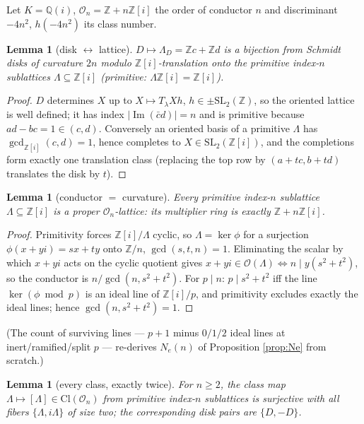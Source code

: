 \documentclass[11pt]{amsart}
\numberwithin{equation}{section}
\theoremstyle{plain}
\newtheorem{lemma}[theorem]{Lemma}
\theoremstyle{definition}
\theoremstyle{remark}
\newcommand{\Q}{\mathbb{Q}}
\newcommand{\Z}{\mathbb{Z}}
\newcommand{\Zi}{\Z[i]}
\newcommand{\SL}{\mathrm{SL}}
\newcommand{\Cl}{\mathrm{Cl}}
\newcommand{\im}{\operatorname{Im}}
\begin{document}
Let $K = \Q(i)$, $\mathcal{O}_n = \Z + n\Zi$ the order of conductor
$n$ and discriminant $-4n^2$, $h(-4n^2)$ its class number.

\begin{lemma}[disk $\leftrightarrow$ lattice]\label{lem:disklattice}
$D \mapsto \Lambda_D = \Z c + \Z d$ is a bijection from Schmidt disks
of curvature $2n$ modulo $\Zi$-translation onto the primitive index-$n$
sublattices $\Lambda \subseteq \Zi$ (primitive: $\Lambda\Zi = \Zi$).
\end{lemma}

\begin{proof}
$D$ determines $X$ up to $X \mapsto T_{\lambda}Xh$, $h \in
\pm\SL_2(\Z)$, so the oriented lattice is well defined; it has index
$|\im(\bar cd)| = n$ and is primitive because $ad - bc = 1 \in (c,
d)$.  Conversely an oriented basis of a primitive $\Lambda$ has
$\gcd_{\Zi}(c, d) = 1$, hence completes to $X \in \SL_2(\Zi)$, and the
completions form exactly one translation class (replacing the top row
by $(a + tc, b + td)$ translates the disk by $t$).
\end{proof}

\begin{lemma}[conductor $=$ curvature]\label{lem:conductor}
Every primitive index-$n$ sublattice $\Lambda \subseteq \Zi$ is a
proper $\mathcal{O}_n$-lattice: its multiplier ring is exactly
$\Z + n\Zi$.
\end{lemma}

\begin{proof}
Primitivity forces $\Zi/\Lambda$ cyclic, so $\Lambda = \ker\phi$ for a
surjection $\phi(x + yi) = sx + ty$ onto $\Z/n$, $\gcd(s, t, n) = 1$.
Eliminating the scalar by which $x + yi$ acts on the cyclic quotient
gives $x + yi \in \mathcal{O}(\Lambda) \iff n \mid y(s^2 + t^2)$, so
the conductor is $n/\gcd(n, s^2 + t^2)$.  For $p \mid n$: $p \mid s^2
+ t^2$ iff the line $\ker(\phi \bmod p)$ is an ideal line of $\Zi/p$,
and primitivity excludes exactly the ideal lines; hence $\gcd(n, s^2 +
t^2) = 1$.
\end{proof}

(The count of surviving lines --- $p + 1$ minus $0/1/2$ ideal lines at
inert/ramified/split $p$ --- re-derives $N_e(n)$ of Proposition
\ref{prop:Ne} from scratch.)

\begin{lemma}[every class, exactly twice]\label{lem:everyclasstwice}
For $n \ge 2$, the class map $\Lambda \mapsto [\Lambda] \in
\Cl(\mathcal{O}_n)$ from primitive index-$n$ sublattices is surjective
with all fibers $\{\Lambda, i\Lambda\}$ of size two; the corresponding
disk pairs are $\{D, -D\}$.
\end{lemma}
\end{document}
